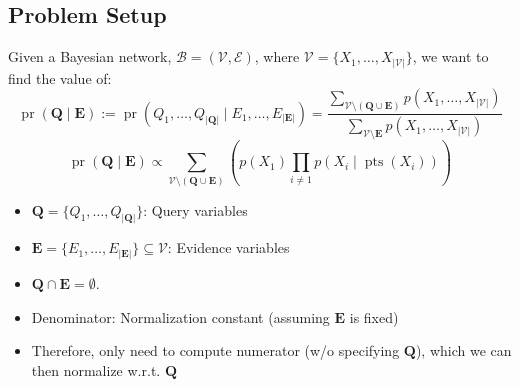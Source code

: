 \subsection{Problem Setup}
\begin{definition}
    Given a Bayesian network, $\mathcal{B} = (\mathcal{V}, \mathcal{E})$, where $\mathcal{V} = \{X_1, \dots, X_{|\mathcal{V}|}\}$, we want to find the value of:
    \[
    \operatorname{pr}(\mathbf{Q} \mid \mathbf{E}) := \operatorname{pr}(Q_1, \dots, Q_{|\mathbf{Q}|} \mid E_1, \dots, E_{|\mathbf{E}|}) = \frac{\sum_{\mathcal{V} \setminus (\mathbf{Q} \cup \mathbf{E})} p(X_1, \dots, X_{|\mathcal{V}|})}
    {\sum_{\mathcal{V} \setminus \mathbf{E}} p(X_1, \dots, X_{|\mathcal{V}|})}
    \]
    \[
    \operatorname{pr}(\mathbf{Q} \mid \mathbf{E}) \propto 
    \sum_{\mathcal{V} \setminus (\mathbf{Q} \cup \mathbf{E})} 
    \left( p(X_1) \prod_{i \neq 1} p(X_i \mid \operatorname{pts}(X_i)) \right)
    \]


    \begin{itemize}
        \item $\mathbf{Q} = \{Q_1, \dots, Q_{|\mathbf{Q}|}\}$: Query variables
        \item $\mathbf{E} = \{E_1, \dots, E_{|\mathbf{E}|}\} \subseteq \mathcal{V}$: Evidence variables
        \item $\mathbf{Q} \cap \mathbf{E} = \emptyset$.
    \end{itemize}
\end{definition}

\begin{warning}
    \begin{itemize}
        \item Denominator: Normalization constant (assuming $\mathbf{E}$ is fixed)
        \item Therefore, only need to compute numerator (w/o specifying $\mathbf{Q}$), which we can then normalize w.r.t. $\mathbf{Q}$
    \end{itemize}
\end{warning}

